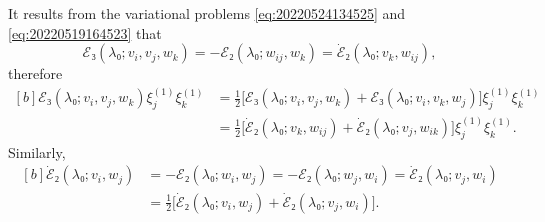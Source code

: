 \documentclass[12pt, final]{scrartcl}
\theoremstyle{definition}
\newcommand{\E}{\mathcal E}
\newcommand{\order}[2][1]{#2^{(#1)}}
\begin{document}
It results from the variational problems \eqref{eq:20220524134525} and
\eqref{eq:20220519164523} that
\begin{equation*}
  \E₃(\lambda₀; v_i, v_j, w_k) = -\E₂(\lambda₀ ; w_{ij}, w_k) = \dot{\E}₂(\lambda₀; v_k, w_{ij}),
\end{equation*}
therefore
\begin{equation*}
  \begin{aligned}[b]
    \E₃(\lambda₀; v_i, v_j, w_k) \order[1]{ξ_j} \order[1]{ξ_k} &= \tfrac{1}{2} \bigl[ \E₃(\lambda₀; v_i, v_j, w_k) + \E₃(\lambda₀; v_i, v_k, w_j)\bigr] \order[1]{ξ_j} \order[1]{ξ_k}\\
                                    &= \tfrac{1}{2} \bigl[ \dot{\E}₂(\lambda₀; v_k, w_{ij}) + \dot{\E}₂(\lambda₀; v_j, w_{ik}) \bigr] \order[1]{ξ_j} \order[1]{ξ_k}.
  \end{aligned}
\end{equation*}
Similarly,
\begin{equation*}
  \begin{aligned}[b]
    \dot{\E}₂(\lambda₀; v_i, w_j) &= -\E₂(\lambda₀; w_i, w_j) = -\E₂(\lambda₀; w_j, w_i) = \dot{\E}₂(\lambda₀; v_j, w_i)\\
                           &= \tfrac{1}{2} \bigl[ \dot{\E}₂(\lambda₀; v_i, w_j) + \dot{\E}₂(\lambda₀; v_j, w_i) \bigr].
  \end{aligned}
\end{equation*}
\end{document}
